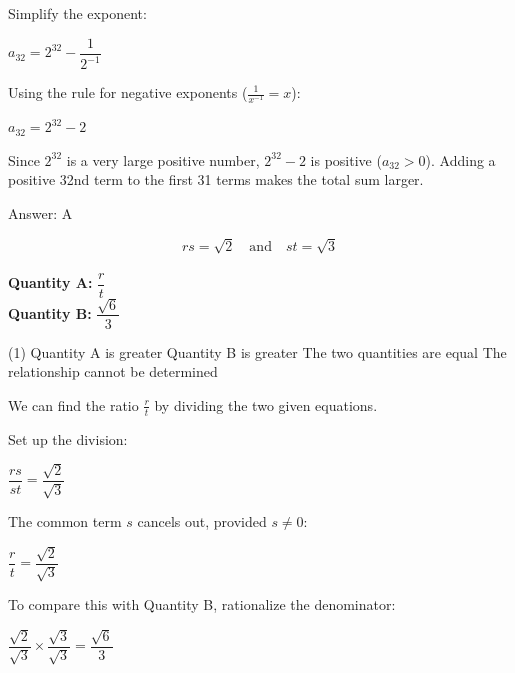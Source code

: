 \documentclass[11pt,paper=a4,answers]{exam}
\begin{document}
\begin{questions}
\begin{solution}
Simplify the exponent:
\begin{center}
$a_{32} = 2^{32} - \dfrac{1}{2^{-1}}$
\end{center}
\vspace{5pt}

Using the rule for negative exponents ($\frac{1}{x^{-1}} = x$):
\begin{center}
$a_{32} = 2^{32} - 2$
\end{center}
\vspace{5pt}

Since $2^{32}$ is a very large positive number, $2^{32} - 2$ is positive ($a_{32} > 0$).
\vspace{5pt}
Adding a positive 32nd term to the first 31 terms makes the total sum larger.

Answer: \colorbox{yellow!100}{A}
\end{solution}

\vspace{1cm}

\question
\[ rs = \sqrt{2} \quad \text{and} \quad st = \sqrt{3} \]
\\[0.3cm]
\textbf{Quantity A: } $\dfrac{r}{t}$ \\
\textbf{Quantity B: } $\dfrac{\sqrt{6}}{3}$

\begin{tasks}(1)
\task[A)] Quantity A is greater
\task[B)] Quantity B is greater
\task[C)] The two quantities are equal
\task[D)] The relationship cannot be determined
\end{tasks}

\begin{solution}
We can find the ratio $\frac{r}{t}$ by dividing the two given equations.
\vspace{5pt}

Set up the division:
\begin{center}
$\dfrac{rs}{st} = \dfrac{\sqrt{2}}{\sqrt{3}}$
\end{center}
\vspace{5pt}

The common term $s$ cancels out, provided $s \neq 0$:
\begin{center}
$\dfrac{r}{t} = \dfrac{\sqrt{2}}{\sqrt{3}}$
\end{center}
\vspace{5pt}

To compare this with Quantity B, rationalize the denominator:
\begin{center}
$\dfrac{\sqrt{2}}{\sqrt{3}} \times \dfrac{\sqrt{3}}{\sqrt{3}} = \dfrac{\sqrt{6}}{3}$
\end{center}
\vspace{5pt}


\end{solution}
\end{questions}
\end{document}
